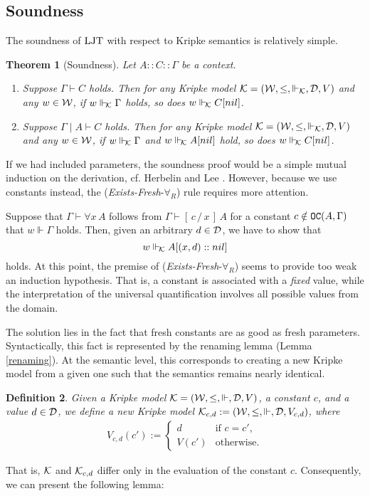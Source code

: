 \documentclass{svjour3}                     %
\newtheorem{thm}{Theorem}%
\newtheorem{defi}[thm]{Definition}
\newcommand{\cald}{{\cal D}}
\newcommand{\calk}{{\cal K}}
\newcommand{\calw}{{\cal W}}
\newcommand{\Ga}{\Gamma}
\newcommand{\vd}{\vdash}
\newcommand{\Vd}{\Vdash}
\newcommand{\substs}[3]{[\, #3\, \slash\, #2\,]\, #1}
\newcommand{\tOC}{\textup{\tt OC}}
\newcommand{\ljt}{\textup{LJT}}
\begin{document}
\subsection{Soundness}
The soundness of $\ljt$ with respect to Kripke semantics is relatively simple.

\begin{thm}[Soundness]\label{soundness}
  Let $A :: C :: \Ga$ be a context.
  \begin{enumerate}
  \item Suppose $\Ga \vd C$ holds. Then for any Kripke model $\calk =
    (\calw, \le,\Vd_\calk, \cald, V)$ and any $w \in \calw$, if $w \Vd_{\!\calk} \Ga$ holds, so does $w \Vd_{\!\calk} C [nil]$.
  \item Suppose $\Ga \mid A \vd C$ holds. Then for any Kripke model $\calk = (\calw, \le,\Vd_\calk, \cald, V)$ and any $w \in \calw$, if $w \Vd_{\!\calk} \Ga$ and $w \Vd_{\!\calk} A [nil]$ hold, so does $w \Vd_{\!\calk} C [nil]$.
  \end{enumerate}
\end{thm}

If we had included parameters, the soundness proof
would be a simple mutual induction on the derivation, cf. Herbelin and Lee \cite{wollic09}. However, because we use constants instead, the ({\it Exists-Fresh}-$\forall_R$) rule requires more attention.

Suppose that $\Ga\vd  \forall x\, A$ follows from $\Ga \vd \substs{A}{x}{c}$ for a constant $c \notin \tOC(A, \Ga)$ that $w \Vd \Ga$ holds. Then, given an arbitrary $d \in \cald$, we have to show that
\begin{equation}
  \label{eq:forall}
  w \Vd_{\!\calk} A [(x,d)::nil]
\end{equation}
holds. 
At this point, the premise of ({\it Exists-Fresh}-$\forall_R$) seems to provide too weak an induction hypothesis. That is, a constant is associated with a \textit{fixed} value, while the interpretation of the universal quantification involves all possible values from the domain. 

The solution lies in the fact that fresh constants are as good as fresh parameters. Syntactically, this fact is represented by the renaming lemma (Lemma \ref{renaming}). At the semantic level, this corresponds to creating a new Kripke model from a given one such that the semantics remains nearly identical.

\begin{defi}
  Given a Kripke model $\calk = (\calw, \le, \Vd, \cald, V)$, a constant $c$, and a value $d \in \cald$, we define a new Kripke model $\calk_{c,d} := (\calw, \le,\Vd, \cald, V_{c,d})$, where
  \begin{eqnarray*}
    V_{c,d} (c') :=
    \begin{cases}
      d & \text{if } c = c', \\
      V(c') & \text{otherwise.}
    \end{cases}
  \end{eqnarray*}
\end{defi}
That is, $\calk$ and $\calk_{c,d}$ differ only in the evaluation of the constant $c$. Consequently, we can present the following lemma:
\end{document}
